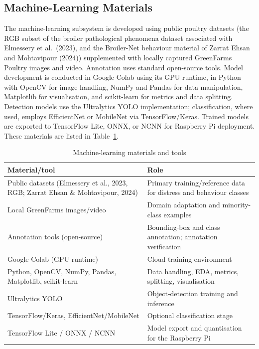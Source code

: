 \documentclass[12pt,a4paper]{report}
\begin{document}
\subsection{Machine-Learning Materials}

The machine-learning subsystem is developed using public poultry datasets (the RGB subset of the broiler pathological phenomena dataset associated with Elmessery et al.\ (2023), and the Broiler-Net behaviour material of Zarrat Ehsan and Mohtavipour (2024)) supplemented with locally captured GreenFarms Poultry images and video. Annotation uses standard open-source tools. Model development is conducted in Google Colab using its GPU runtime, in Python with OpenCV for image handling, NumPy and Pandas for data manipulation, Matplotlib for visualisation, and scikit-learn for metrics and data splitting. Detection models use the Ultralytics YOLO implementation; classification, where used, employs EfficientNet or MobileNet via TensorFlow/Keras. Trained models are exported to TensorFlow Lite, ONNX, or NCNN for Raspberry Pi deployment. These materials are listed in Table~\ref{tab:mlmat}.

\begin{table}[tbp]
\caption{Machine-learning materials and tools}
\label{tab:mlmat}
\centering
\small
\begin{tabularx}{\textwidth}{|>{\raggedright\arraybackslash}p{3.3cm}|X|}
\hline
\rowcolor{headerblue}
\textbf{Material/tool} & \textbf{Role} \\
\hline
Public datasets (Elmessery et al., 2023, RGB; Zarrat Ehsan \& Mohtavipour, 2024) & Primary training/reference data for distress and behaviour classes \\
\hline
Local GreenFarms images/video & Domain adaptation and minority-class examples \\
\hline
Annotation tools (open-source) & Bounding-box and class annotation; annotation verification \\
\hline
Google Colab (GPU runtime) & Cloud training environment \\
\hline
Python, OpenCV, NumPy, Pandas, Matplotlib, scikit-learn & Data handling, EDA, metrics, splitting, visualisation \\
\hline
Ultralytics YOLO & Object-detection training and inference \\
\hline
TensorFlow/Keras, EfficientNet/MobileNet & Optional classification stage \\
\hline
TensorFlow Lite / ONNX / NCNN & Model export and quantisation for the Raspberry Pi \\
\hline
\end{tabularx}
\end{table}
\end{document}
